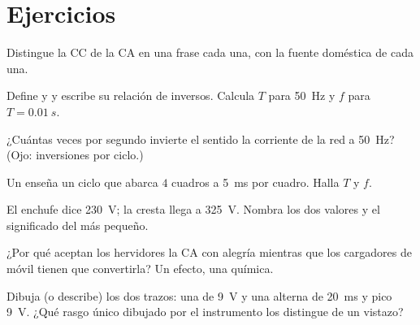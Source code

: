 \section{Ejercicios}

\begin{exercise}[$\star$]\label{exo:g9:alternating-current:1}
Distingue la CC de la CA en una frase cada una, con la fuente doméstica
de cada una.
\end{exercise}

\begin{exercise}[$\star$]\label{exo:g9:alternating-current:2}
Define  y  y escribe su relación de
inversos. Calcula $T$ para \qty{50}{Hz} y $f$ para $T =
\qty{0.01}{s}$.
\end{exercise}

\begin{exercise}[$\star$]\label{exo:g9:alternating-current:3}
¿Cuántas veces por segundo invierte el sentido la corriente de la red a
\qty{50}{Hz}? (Ojo: inversiones por ciclo.)
\end{exercise}

\begin{exercise}[$\star$]\label{exo:g9:alternating-current:4}
Un  enseña un ciclo que abarca $4$ cuadros a \qty{5}{ms}
por cuadro. Halla $T$ y $f$.
\end{exercise}

\begin{exercise}[$\star$]\label{exo:g9:alternating-current:5}
El enchufe dice \qty{230}{V}; la cresta llega a \qty{325}{V}. Nombra
los dos valores y el significado del más pequeño.
\end{exercise}

\begin{exercise}[$\star$]\label{exo:g9:alternating-current:6}
¿Por qué aceptan los hervidores la CA con alegría mientras que los
cargadores de móvil tienen que convertirla? Un efecto, una química.
\end{exercise}

\begin{exercise}[$\star$]\label{exo:g9:alternating-current:7}
Dibuja (o describe) los dos trazos: una  de \qty{9}{V} y una
 alterna de  \qty{20}{ms} y pico
\qty{9}{V}. ¿Qué rasgo único dibujado por el instrumento los distingue
de un vistazo?
\end{exercise}

